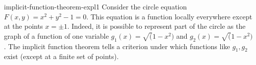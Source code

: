 \documentclass[preview]{standalone}
\begin{document}
\genpage

\begin{snippet}{implicit-function-theorem-expl1}
    Consider the circle equation \(F(x,y)=x^2+y^2-1=0\).
    This equation is a function locally everywhere except at the points \(x=\pm 1\).
    Indeed, it is possible to represent part of the circle as the graph
    of a function of one variable \(g_1(x) = \sqrt(1-x^2)\) and
    \(g_2(x) = \sqrt(1-x^2)\).
    The implicit function theorem tells a criterion under which
    functions like \(g_1, g_2\) exist (except at a finite set of points). 
\end{snippet}
\end{document}
